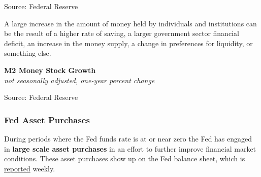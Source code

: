 \documentclass{report}
\makeatletter
\newcommand{\tbllink}[1]{\href{https://raw.githubusercontent.com/bdecon/US-chartbook/master/chartbook/data/#1}{\faTable}}
\newcommand*\short[1]{\expandafter\@gobbletwo\number\numexpr#1\relax}
\newcommand{\dateaxisticks}{
		date coordinates in=x, axis line style={draw=none},
		xmax={2024-01-31},
		max space between ticks=40,	    
		xtick={{1990-01-01}, {1992-01-01}, {1994-01-01}, 
			{1996-01-01}, {1998-01-01}, {2000-01-01}, 
			{2002-01-01}, {2004-01-01}, {2006-01-01},
			{2008-01-01}, {2010-01-01}, {2012-01-01}, {2014-01-01},
		    {2016-01-01}, {2018-01-01}, {2020-01-01}, {2022-01-01}, 
		    {2024-01-01}, {2026-01-01}},
		minor xtick={{1989-01-01}, {1991-01-01}, {1993-01-01},
			{1995-01-01}, {1997-01-01}, {1999-01-01}, 
			{2001-01-01}, {2003-01-01}, {2005-01-01}, {2007-01-01},
		    {2009-01-01}, {2011-01-01}, {2013-01-01}, {2015-01-01},
		    {2017-01-01}, {2019-01-01}, {2021-01-01}, {2023-01-01}, 
		    {2025-01-01}, {2027-01-01}},
		enlarge y limits={0.06}, enlarge x limits={0.01},
		xticklabel style={align=center, yshift=-2pt}, tick label style={inner sep=0pt},
		}
\newcommand{\bbar}[2]{extra #1 ticks = {{#2}}, extra #1 tick labels = ,
		extra #1 tick style = {grid=major, grid style={thick, black!25}},}
\newcommand{\thickline}[4]{\addplot[ultra thick, no markers, color=#1] 
		table [x=#2, y=#3, col sep=comma] {#4};	}
\newcommand{\rbars}{
		\fill[color=black!10] (axis cs:{1990-07-01},\pgfkeysvalueof{/pgfplots/ymin})
			rectangle (axis cs:{1991-03-01}, \pgfkeysvalueof{/pgfplots/ymax});
		\fill[color=black!10] (axis cs:{2007-12-01},\pgfkeysvalueof{/pgfplots/ymin})
			rectangle (axis cs:{2009-07-01}, \pgfkeysvalueof{/pgfplots/ymax});
		\fill[color=black!10] (axis cs:{2001-03-01},\pgfkeysvalueof{/pgfplots/ymin})
			rectangle (axis cs:{2001-11-01}, \pgfkeysvalueof{/pgfplots/ymax});
		\fill[color=black!10] (axis cs:{2020-02-01},\pgfkeysvalueof{/pgfplots/ymin})
			rectangle (axis cs:{2020-05-01}, \pgfkeysvalueof{/pgfplots/ymax});}
\makeatother
\begin{document}
{\begin{minipage}{1.0\textwidth}
\begin{minipage}{0.42\textwidth}
\footnotesize{Source: Federal Reserve} \hfill \tbllink{m2gdp.csv}
\end{minipage}
\vspace{1mm}

A large increase in the amount of money held by individuals and institutions can be the result of a higher rate of saving, a larger government sector financial deficit, an increase in the money supply, a change in preferences for liquidity, or something else.


\vspace{1mm}

\normalsize \textbf{M2 Money Stock Growth}\\
\footnotesize{\textit{not seasonally adjusted, one-year percent change}}
\vspace{3.0cm}

\hspace{3mm} 

\footnotesize{Source: Federal Reserve} \hfill \tbllink{m2.csv}
\end{minipage}
\newpage
\begin{minipage}{1.0\textwidth}
\subsubsection*{Fed Asset Purchases}  
\small During periods where the Fed funds rate is at or near zero the Fed has engaged in \textbf{large scale asset purchases} in an effort to further improve financial market conditions. These asset purchases show up on the Fed balance sheet, which is \href{https://www.federalreserve.gov/releases/h41/current/default.htm}{reported} weekly. 




\end{minipage}

}
\end{document}
